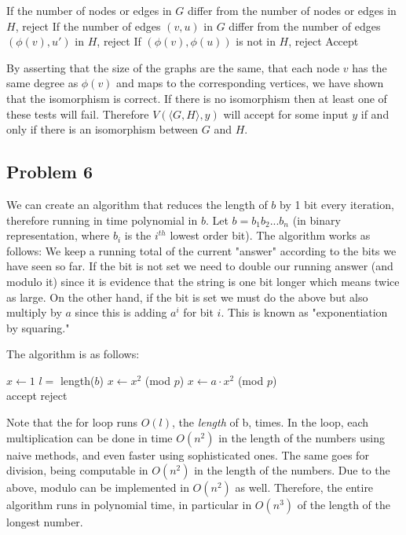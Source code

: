 \documentclass[english]{article}
\begin{document}
\begin{algorithmic}
\State If the number of nodes or edges in $G$ differ from the number of nodes
		or edges in $H$, reject
	\State If the number of edges $(v,u)$ in $G$ differ from the number of
			edges $(\phi(v),u')$ in $H$, reject
		\State If $(\phi(v),\phi(u))$ is not in $H$, reject
	\EndFor
\EndFor
\State Accept
\EndFunction 
\end{algorithmic}

By asserting that the size of the graphs are the same, that each node $v$ has
the same degree as $\phi(v)$ and maps to the corresponding vertices, we have
shown that the isomorphism is correct. If there is no isomorphism then at
least one of these tests will fail. Therefore $V(\langle G, H \rangle,y)$
will accept for some input $y$ if and only if there is an isomorphism between
$G$ and $H$.

\subsection*{Problem 6}
We can create an algorithm that reduces the length of $b$ by 1 bit every iteration,
therefore running in time polynomial in $b$. Let $b=b_1b_2...b_n$ (in binary representation,
where $b_i$ is the $i^{th}$ lowest order bit).
The algorithm works as follows: We keep a running total of the current "answer" according to
the bits we have seen so far. If the bit is not set we need to double our running answer (and
modulo it) since it is evidence that the string is one bit longer which means twice as large.
On the other hand, if the bit is set we must do the above but also multiply by $a$ since this
is adding $a^i$ for bit $i$. This is known as "exponentiation by squaring."

The algorithm is as follows:
\begin{algorithmic}
	\State $x \gets 1$
	\State $l = $ length($b$)
			\State $x \gets x^2$ (mod $p$)
		\Else
			\State $x \gets a \cdot x^2$ (mod $p$)
		\EndIf
	\EndFor \\
	
		\State accept
	\Else
		\State reject
	\EndIf
\end{algorithmic}

Note that the for loop runs $O(l)$, the \emph{length} of b, times.
In the loop, each multiplication can be done in time $O(n^2)$ in the length of the numbers using
naive methods, and even faster using sophisticated ones.
The same goes for division, being computable in $O(n^2)$ in the length of the numbers.
Due to the above, modulo can be implemented in $O(n^2)$ as well.
Therefore, the entire algorithm runs in polynomial time, in particular in $O(n^3)$ of the
length of the longest number.
\end{document}
